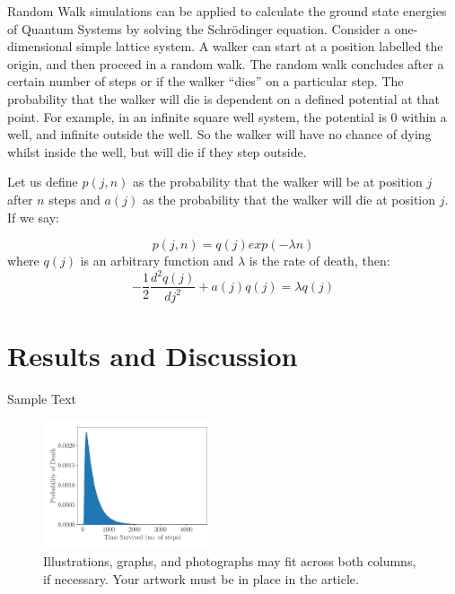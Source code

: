 \documentclass[journal]{IEEEtran}
\begin{document}
Random Walk simulations can be applied to calculate the ground state energies of
Quantum Systems by solving the Schr\"{o}dinger equation. Consider a
one-dimensional simple lattice system. A walker can start at a position labelled
the origin, and then proceed in a random walk. The random walk concludes after a
certain number of steps or if the walker ``dies'' on a particular step. The
probability that the walker will die is dependent on a defined potential at that
point. For example, in an infinite square well system, the potential is 0 within
a well, and infinite outside the well. So the walker will have no chance of
dying whilst inside the well, but will die if they step outside.

Let us define $p(j,n)$ as the probability that the walker will be at position
$j$ after $n$ steps and $a(j)$ as the probability that the walker will die at
position $j$. If we say:

\begin{equation}
  p(j,n) = q(j) exp(-\lambda n)
  \nonumber
\end{equation}
where $q(j)$ is an arbitrary function and $\lambda$ is the rate of death, then:
\begin{equation}
  -\frac{1}{2} \frac{d^2q(j)}{dj^2} + a(j)q(j) = \lambda q(j)
  \nonumber
\end{equation}

\section{Results and Discussion}

Sample Text

\begin{figure}[H]%
  \begin{center}
    \includegraphics[width=0.45\textwidth]{images/exp_plot.pdf}
    \caption{Illustrations, graphs, and photographs may fit across both columns, if necessary. Your artwork must be in place in the article.}
    \label{fig:exp_plot}
  \end{center}
\end{figure}
\end{document}
